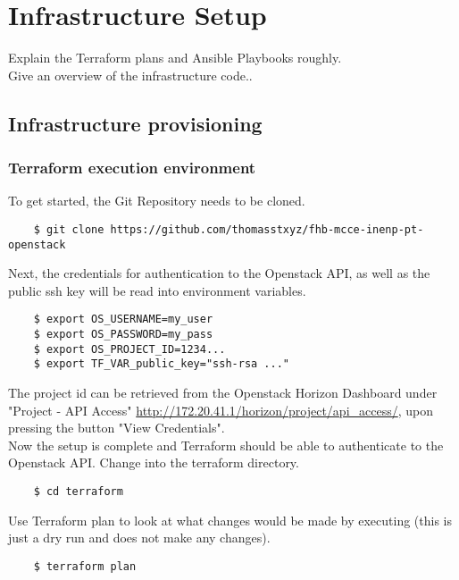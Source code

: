 \section{Infrastructure Setup}
Explain the Terraform plans and Ansible Playbooks roughly. \\

\noindent Give an overview of the infrastructure code..

\subsection{Infrastructure provisioning}

\subsubsection{Terraform execution environment}
To get started, the Git Repository needs to be cloned.

\begin{verbatim}
	$ git clone https://github.com/thomasstxyz/fhb-mcce-inenp-pt-openstack
\end{verbatim}

\noindent
Next, the credentials for authentication to the Openstack API,
as well as the public ssh key will be
read into environment variables.

\begin{verbatim}
	$ export OS_USERNAME=my_user
	$ export OS_PASSWORD=my_pass
	$ export OS_PROJECT_ID=1234...
	$ export TF_VAR_public_key="ssh-rsa ..."	
\end{verbatim}

\noindent
The project id can be retrieved from the Openstack Horizon Dashboard
under "Project - API Access" 
\url{http://172.20.41.1/horizon/project/api_access/},
upon pressing the button "View Credentials". \\

\noindent
Now the setup is complete and Terraform should be able to authenticate
to the Openstack API. Change into the terraform directory.

\begin{verbatim}
	$ cd terraform
\end{verbatim}

\noindent
Use Terraform plan to look at what changes would be made by executing
(this is just a dry run and does not make any changes).

\begin{verbatim}
	$ terraform plan
\end{verbatim}

